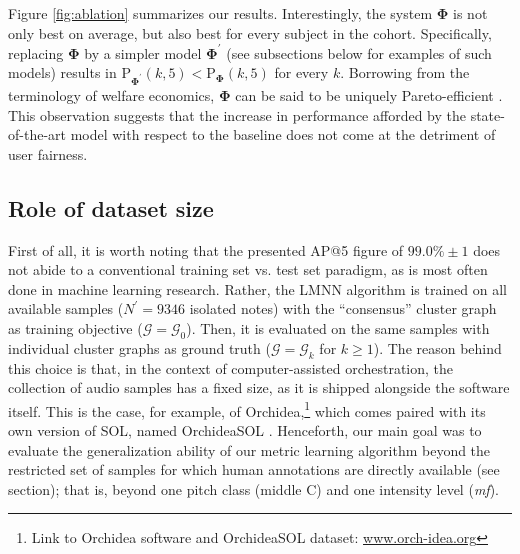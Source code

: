 \documentclass{bmcart}
\newcommand{\lnameref}[1]{%
\bgroup
\let\nmu\MakeLowercase
\nameref{#1}\egroup}
\newcommand{\nmu}{}
\begin{document}
Figure \ref{fig:ablation} summarizes our results.
Interestingly, the system $\boldsymbol{\Phi}$ is not only best on average, but also best for every subject in the cohort.
Specifically, replacing $\boldsymbol{\Phi}$ by a simpler model $\boldsymbol{\Phi}^{\prime}$ (see subsections below for examples of such models) results in $\mathrm{P}_{\mathbf{\Phi^\prime}}(k, 5) < \mathrm{P}_{\mathbf{\Phi}}(k, 5)$ for every $k$.
Borrowing from the terminology of welfare economics, $\boldsymbol{\Phi}$ can be said to be uniquely Pareto-efficient \cite{black2012dictionary}.
This observation suggests that the increase in performance afforded by the state-of-the-art model with respect to the baseline does not come at the detriment of user fairness.


\subsection*{Role of dataset size}
First of all, it is worth noting that the presented AP@5 figure of $99.0\% \pm 1$ does not abide to a conventional training set vs. test set paradigm, as is most often done in machine learning research.
Rather, the LMNN algorithm is trained on all available samples ($N^{\prime}=9346$ isolated notes) with the ``consensus'' cluster graph as training objective ($\mathcal{G}=\mathcal{G}_0$).
Then, it is evaluated on the same samples with individual cluster graphs as ground truth ($\mathcal{G}=\mathcal{G}_k$ for $k\geq1$).
The reason behind this choice is that, in the context of computer-assisted orchestration, the collection of audio samples has a fixed size, as it is shipped alongside the software itself.
This is the case, for example, of Orchidea,\footnote{Link to Orchidea software and OrchideaSOL dataset: \url{www.orch-idea.org}} which comes paired with its own version of SOL, named OrchideaSOL \cite{cella2020icmc}.
Henceforth, our main goal was to evaluate the generalization ability of our metric learning algorithm beyond the restricted set of samples for which human annotations are directly available (see \lnameref{sec:data-collection} section); that is, beyond one pitch class (middle C) and one intensity level (\emph{mf}).
\end{document}
